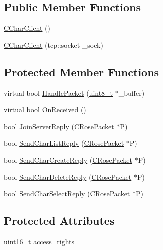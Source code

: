 \subsection*{Public Member Functions}
\begin{DoxyCompactItemize}
\item 
\hyperlink{classCCharClient_a142815393ef1539fdee80cc425a0ed2f}{C\+Char\+Client} ()
\item 
\hyperlink{classCCharClient_a945d2d2ad1afc5492ec4481825d8dd86}{C\+Char\+Client} (tcp\+::socket \+\_\+sock)
\end{DoxyCompactItemize}
\subsection*{Protected Member Functions}
\begin{DoxyCompactItemize}
\item 
virtual bool \hyperlink{classCCharClient_ae9d8df0ca2e016d3ed58353ce06b4edf}{Handle\+Packet} (\hyperlink{stdint_8h_aba7bc1797add20fe3efdf37ced1182c5}{uint8\+\_\+t} $\ast$\+\_\+buffer)
\item 
virtual bool \hyperlink{classCCharClient_acd27b8c60adcbc4212753e439c494dab}{On\+Received} ()
\item 
bool \hyperlink{classCCharClient_a722f185fee844b1965bc97e434be35e1}{Join\+Server\+Reply} (\hyperlink{structCRosePacket}{C\+Rose\+Packet} $\ast$P)
\item 
bool \hyperlink{classCCharClient_a04e443f08d4f488a6e8972a6b2ca4a96}{Send\+Char\+List\+Reply} (\hyperlink{structCRosePacket}{C\+Rose\+Packet} $\ast$P)
\item 
bool \hyperlink{classCCharClient_a12a650e77e5beff3b906b53efe9495fa}{Send\+Char\+Create\+Reply} (\hyperlink{structCRosePacket}{C\+Rose\+Packet} $\ast$P)
\item 
bool \hyperlink{classCCharClient_ac0c5180f8b3ad8abf9c8f738c9a6cf82}{Send\+Char\+Delete\+Reply} (\hyperlink{structCRosePacket}{C\+Rose\+Packet} $\ast$P)
\item 
bool \hyperlink{classCCharClient_a60b7f6e48b1f68ad2de8db649da401ef}{Send\+Char\+Select\+Reply} (\hyperlink{structCRosePacket}{C\+Rose\+Packet} $\ast$P)
\end{DoxyCompactItemize}
\subsection*{Protected Attributes}
\begin{DoxyCompactItemize}
\item 
\hyperlink{stdint_8h_a273cf69d639a59973b6019625df33e30}{uint16\+\_\+t} \hyperlink{classCCharClient_a7ba9ed7830f1222806e482f4fefee34b}{access\+\_\+rights\+\_\+}
\end{DoxyCompactItemize}


